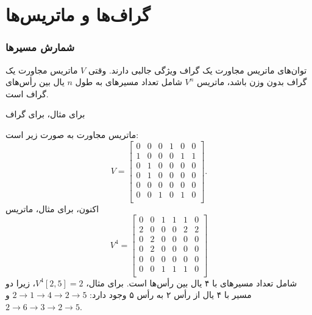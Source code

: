 \section{گراف‌ها و ماتریس‌ها}

\subsubsection{شمارش مسیرها}

توان‌های ماتریس مجاورت یک گراف ویژگی جالبی دارند.
وقتی $V$ ماتریس مجاورت یک گراف بدون وزن باشد،
ماتریس $V^n$ شامل تعداد مسیرهای به طول $n$ یال بین رأس‌های گراف است.

برای مثال، برای گراف
\begin{center}
\end{center}
ماتریس مجاورت به صورت زیر است:
\[
V= \begin{bmatrix}
  0 & 0 & 0 & 1 & 0 & 0 \\
  1 & 0 & 0 & 0 & 1 & 1 \\
  0 & 1 & 0 & 0 & 0 & 0 \\
  0 & 1 & 0 & 0 & 0 & 0 \\
  0 & 0 & 0 & 0 & 0 & 0 \\
  0 & 0 & 1 & 0 & 1 & 0 \\
 \end{bmatrix}.
\]
اکنون، برای مثال، ماتریس
\[
V^4= \begin{bmatrix}
  0 & 0 & 1 & 1 & 1 & 0 \\
  2 & 0 & 0 & 0 & 2 & 2 \\
  0 & 2 & 0 & 0 & 0 & 0 \\
  0 & 2 & 0 & 0 & 0 & 0 \\
  0 & 0 & 0 & 0 & 0 & 0 \\
  0 & 0 & 1 & 1 & 1 & 0 \\
 \end{bmatrix}
\]
شامل تعداد مسیرهای با ۴ یال
بین رأس‌ها است.
برای مثال، $V^4[2,5]=2$،
زیرا دو مسیر با ۴ یال
از رأس ۲ به رأس ۵ وجود دارد:
$2 \rightarrow 1 \rightarrow 4 \rightarrow 2 \rightarrow 5$
و 
$2 \rightarrow 6 \rightarrow 3 \rightarrow 2 \rightarrow 5$.

